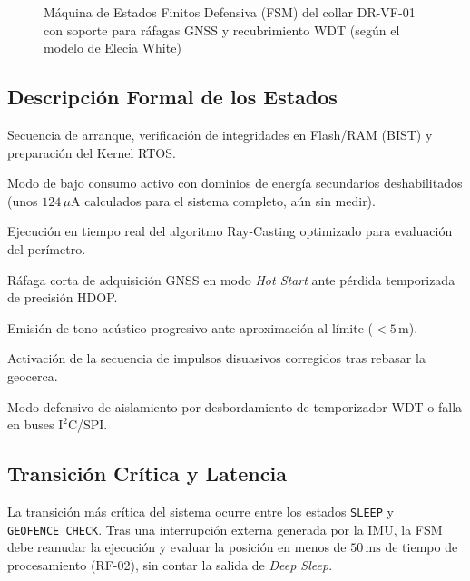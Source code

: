 \begin{figure}[H]
{%
}
\caption{Máquina de Estados Finitos Defensiva (FSM) del collar DR-VF-01 con soporte para ráfagas GNSS y recubrimiento WDT (según el modelo de Elecia White)}
\label{fig:fsm_diagram_complete}
\end{figure}

\subsection{Descripción Formal de los Estados}

\begin{description}[leftmargin=*, style=nextline, font=\bfseries\ttfamily]
    \item[INIT] Secuencia de arranque, verificación de integridades en Flash/RAM (BIST) y preparación del Kernel RTOS.
    \item[SLEEP] Modo de bajo consumo activo con dominios de energía secundarios deshabilitados (unos $124\,\mu\text{A}$ calculados para el sistema completo, aún sin medir).
    \item[GEOFENCE\_CHECK] Ejecución en tiempo real del algoritmo Ray-Casting optimizado para evaluación del perímetro.
    \item[GNSS\_UPDATE] Ráfaga corta de adquisición GNSS en modo \textit{Hot Start} ante pérdida temporizada de precisión HDOP.
    \item[WARNING] Emisión de tono acústico progresivo ante aproximación al límite ($< 5\,\text{m}$).
    \item[DISUASION] Activación de la secuencia de impulsos disuasivos corregidos tras rebasar la geocerca.
    \item[ERROR] Modo defensivo de aislamiento por desbordamiento de temporizador WDT o falla en buses $\text{I}^2\text{C}$/SPI.
\end{description}

\subsection{Transición Crítica y Latencia}

La transición más crítica del sistema ocurre entre los estados \texttt{SLEEP} y \texttt{GEOFENCE\_CHECK}. Tras una interrupción externa generada por la IMU, la FSM debe reanudar la ejecución y evaluar la posición en menos de $50\,\text{ms}$ de tiempo de procesamiento (RF-02), sin contar la salida de \emph{Deep Sleep}.

